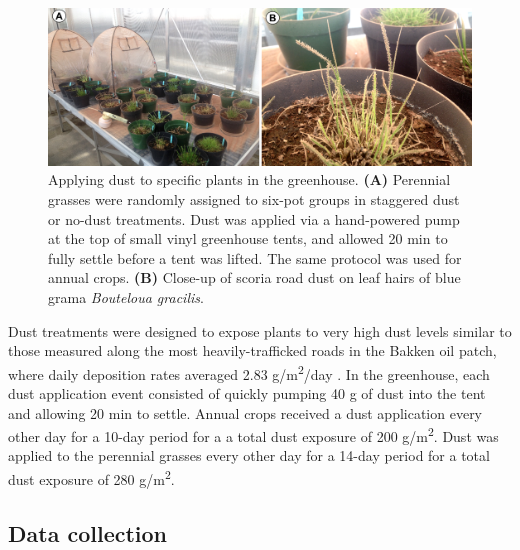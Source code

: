 \documentclass{svjour3}
\begin{document}
\begin{figure}
  \includegraphics[width=\linewidth]{figures/GreenhouseDust}
  \caption{Applying dust to specific plants in the greenhouse. 
  \textbf{(A)} Perennial grasses were randomly assigned to six-pot groups in staggered dust or no-dust treatments. 
  Dust was applied via a hand-powered pump at the top of small vinyl greenhouse tents, and allowed 20 min to fully settle before a tent was lifted. 
  The same protocol was used for annual crops. 
  \textbf{(B)} Close-up of scoria road dust on leaf hairs of blue grama \emph{Bouteloua gracilis}. 
  \label{pic:dusting}}
\end{figure}

Dust treatments were designed to expose plants to very high dust levels similar to those measured along the most heavily-trafficked roads in the Bakken oil patch, where daily deposition rates averaged 2.83 g/m\textsuperscript{2}/day \citep{spiess2020}. 
In the greenhouse, each dust application event consisted of quickly pumping 40 g of dust into the tent and allowing 20 min to settle.
Annual crops received a dust application every other day for a 10-day period for a  a total dust exposure of 200 g/m\textsuperscript{2}.
Dust was applied to the perennial grasses every other day for a 14-day period for a total dust exposure of 280 g/m\textsuperscript{2}.

\subsection{Data collection} 
\end{document}
